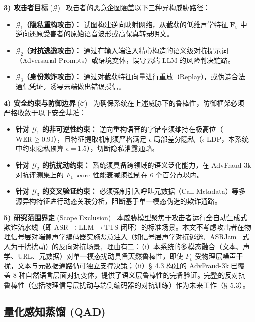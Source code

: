 \documentclass[11pt, a4paper]{article}
\begin{document}
\textbf{3) 攻击者目标} ($\mathcal{G}$)
~攻击者的恶意企图涵盖以下三种异构威胁路径：

\begin{itemize}
    \item \textbf{$\mathcal{G}_1$（隐私重构攻击）：} 试图构建逆向映射网络，从截获的低维声学特征 $\bm{F}_v$ 中逆向还原受害者的原始语音波形或高保真转录明文。
    \item \textbf{$\mathcal{G}_2$（对抗逃逸攻击）：} 通过在输入端注入精心构造的语义级对抗提示词（Adversarial Prompts）或语境变体，误导云端 LLM 的风险判决链路。
    \item \textbf{$\mathcal{G}_3$（身份欺诈攻击）：} 通过对截获特征向量进行重放（Replay），或伪造合法通信凭证，诱导云端做出错误授信。
\end{itemize}

\textbf{4) 安全约束与防御边界} ($\mathcal{C}$)
~为确保系统在上述威胁下的鲁棒性，防御框架必须严格收敛于以下安全基准：
\begin{itemize}
    \item \textbf{针对 $\mathcal{G}_1$ 的非可逆性约束：} 逆向重构语音的字错率须维持在极高位（$\text{WER} \ge 0.90$），且特征提取机制须严格满足 $\epsilon$-局部差分隐私（$\epsilon$-LDP，本系统中约束隐私预算 $\epsilon = 1.5$），切断隐私泄露通路。
    \item \textbf{针对 $\mathcal{G}_2$ 的抗扰动约束：} 系统须具备跨领域的语义泛化能力，在 AdvFraud-3k 对抗评测集上的 $F_1\text{-score}$ 性能衰减须控制在 6 个百分点以内。
    \item \textbf{针对 $\mathcal{G}_3$ 的交叉验证约束：} 必须强制引入呼叫元数据（Call Metadata）等多源异构特征进行动态关联分析，阻断基于单一模态伪造的欺诈通路。
\end{itemize}

\textbf{5) 研究范围界定} (Scope Exclusion)
~本威胁模型聚焦于攻击者运行全自动生成式欺诈流水线（即 $\text{ASR}\!\rightarrow\!\text{LLM}\!\rightarrow\!\text{TTS}$ 闭环）的标准场景。本文不考虑攻击者在物理信号层对端侧声学编码器实施恶意注入（如信号层声学对抗逃逸、ASRJam~\cite{Grabovski2025ASRJam} 式人为干扰扰动）的反向对抗场景，理由有二：（i）本系统的多模态融合（文本、声学、URL、元数据）对单一模态扰动具备天然鲁棒性，即使 $F_v$ 受物理层噪声干扰，文本与元数据通路仍可独立支撑决策；（ii）\S~4.3 构建的 AdvFraud-3k 已覆盖 8 种自然语言层面对抗变体，提供了语义层鲁棒性的完备验证。完整的反对抗鲁棒性（包括物理信号层扰动与端侧编码器的对抗训练）作为未来工作（\S~5.3）。
 
\subsection{量化感知蒸馏 (QAD)}
\end{document}
